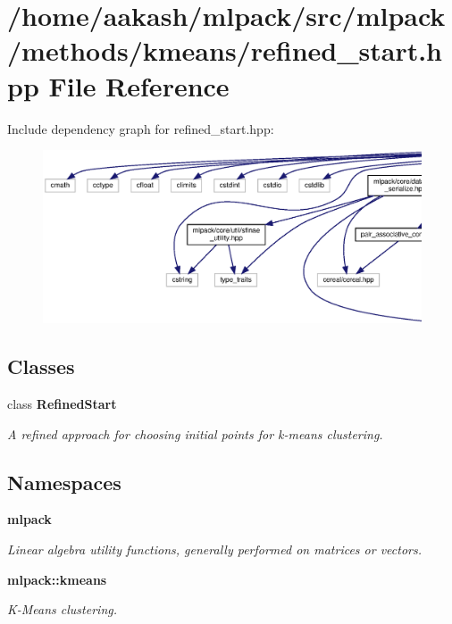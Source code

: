 \section{/home/aakash/mlpack/src/mlpack/methods/kmeans/refined\+\_\+start.hpp File Reference}
\label{refined__start_8hpp}
Include dependency graph for refined\+\_\+start.\+hpp\+:
\nopagebreak
\begin{figure}[H]
\begin{center}
\leavevmode
\includegraphics[width=350pt]{refined__start_8hpp__incl}
\end{center}
\end{figure}
\subsection*{Classes}
\begin{DoxyCompactItemize}
\item 
class \textbf{ Refined\+Start}
\begin{DoxyCompactList}\small\item\em A refined approach for choosing initial points for k-\/means clustering. \end{DoxyCompactList}\end{DoxyCompactItemize}
\subsection*{Namespaces}
\begin{DoxyCompactItemize}
\item 
 \textbf{ mlpack}
\begin{DoxyCompactList}\small\item\em Linear algebra utility functions, generally performed on matrices or vectors. \end{DoxyCompactList}\item 
 \textbf{ mlpack\+::kmeans}
\begin{DoxyCompactList}\small\item\em K-\/\+Means clustering. \end{DoxyCompactList}\end{DoxyCompactItemize}


